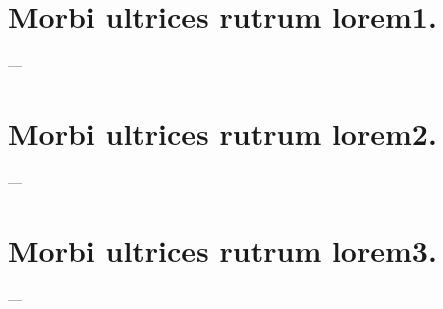 \documentclass[
	12pt,									%
	openright,						    %
	oneside,							%
	a4paper,							%
	english,							%
	spanish,							%
	brazil,								%
	]{abntex2}
\begin{document}
\frenchspacing 			%


\imprimircapa					%
\imprimirfolhaderosto*		    %




\listoffigures*
\cleardoublepage


\listoftables*
\cleardoublepage


\tableofcontents*
\cleardoublepage

\textual


\chapter{Morbi ultrices rutrum lorem1.}
 ---
\lipsum[30]

\begin{table}[h]
\begin{tabular}



\end{tabular}
\end{table}





\chapter{Morbi ultrices rutrum lorem2.}
 ---
\lipsum[30]


\chapter{Morbi ultrices rutrum lorem3.}
 ---
\lipsum[30]



\postextual
\end{document}
